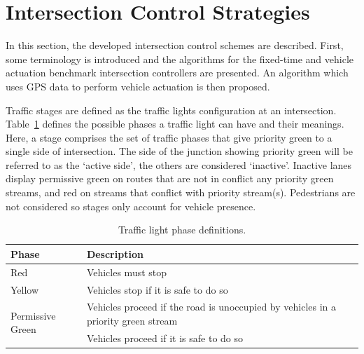 \documentclass[numbered]{trbunofficial}
\begin{document}
\section{Intersection Control Strategies}\label{sec:ctrllog}
In this section, the developed intersection control schemes are described. First, some terminology is introduced and the algorithms for the fixed-time and vehicle actuation benchmark intersection controllers are presented. An algorithm which uses GPS data to perform vehicle actuation is then proposed.


Traffic stages are defined as the traffic lights configuration at an intersection. Table~\ref{tab:tlType} defines the possible phases a traffic light can have and their meanings. Here, a stage comprises the set of traffic phases that give priority green to a single side of intersection. The side of the junction showing priority green will be referred to as the `active side', the others are considered `inactive'. Inactive lanes display permissive green on routes that are not in conflict any priority green streams, and red on streams that conflict with priority stream(s). Pedestrians are not considered so stages only account for vehicle presence.

\begin{table}[htb]
	\small
	\centering
	\caption{Traffic light phase definitions.\vspace{-1.0ex}}
	\begin{tabular}{p{2.5cm}p{5.5cm} }
		\toprule
		\textbf{Phase} & \textbf{Description} \\ \toprule
		Red & Vehicles must stop \\ \midrule
		Yellow & Vehicles stop if it is safe to do so \\ \midrule
		\multirow{2}{2.5cm}{Permissive Green} & Vehicles proceed if the road is unoccupied by vehicles in a priority green stream \\ \midrule
		Priority Green & Vehicles proceed if it is safe to do so \\ 
		\bottomrule
	\end{tabular}
	\label{tab:tlType}
\end{table}
\end{document}
